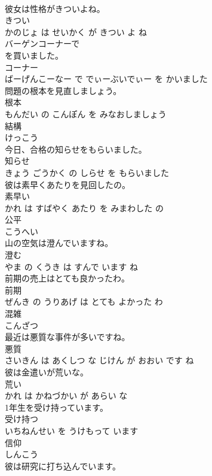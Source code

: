 \documentclass[8pt]{extreport}
\begin{document}
\begin{CJK}{UTF8}{min}
\\	彼女は性格がきついよね。	
\\	きつい 
\\	かのじょ は せいかく が きつい よ ね			
\\	バーゲンコーナーで
\\	を買いました。	
\\	コーナー 
\\	ばーげんこーなー で でぃーぶいでぃー を かいました			
\\	問題の根本を見直しましょう。	
\\	根本 
\\	もんだい の こんぽん を みなおしましょう			
\\	結構	
\\	けっこう		
\\	今日、合格の知らせをもらいました。	
\\	知らせ 
\\	きょう ごうかく の しらせ を もらいました			
\\	彼は素早くあたりを見回したの。	
\\	素早い 
\\	かれ は すばやく あたり を みまわした の			
\\	公平	
\\	こうへい		
\\	山の空気は澄んでいますね。	
\\	澄む 
\\	やま の くうき は すんで います ね			
\\	前期の売上はとても良かったわ。	
\\	前期 
\\	ぜんき の うりあげ は とても よかった わ			
\\	混雑	
\\	こんざつ		
\\	最近は悪質な事件が多いですね。	
\\	悪質 
\\	さいきん は あくしつ な じけん が おおい です ね			
\\	彼は金遣いが荒いな。	
\\	荒い 
\\	かれ は かねづかい が あらい な			
\\	1年生を受け持っています。	
\\	受け持つ 
\\	いちねんせい を うけもって います			
\\	信仰	
\\	しんこう		
\\	彼は研究に打ち込んでいます。	

\end{CJK}
\end{document}
